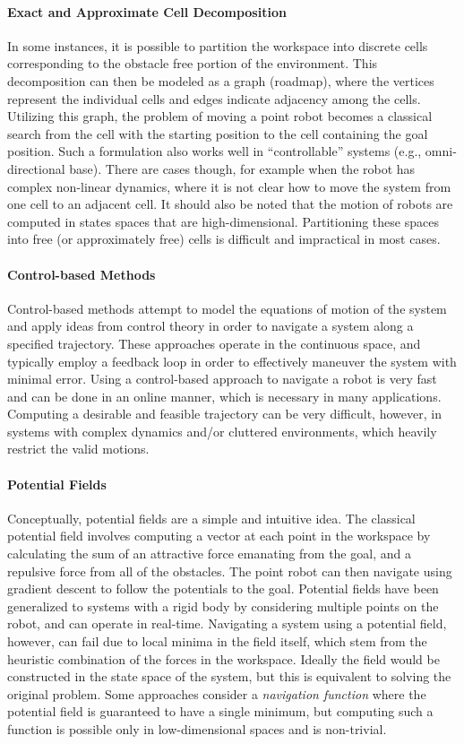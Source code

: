 \paragraph {Exact and Approximate Cell Decomposition}
In some instances, it is possible to partition the workspace into discrete 
cells corresponding to the obstacle free portion of the environment. This 
decomposition can then be modeled as a graph (roadmap), where the vertices 
represent the individual cells and edges indicate adjacency among the cells. 
Utilizing this graph, the problem of moving a point robot becomes a classical 
search from the cell with the starting position to the cell containing the goal 
position. Such a formulation also works well in ``controllable'' systems (e.g., 
omni-directional base). There are cases though, for example when the robot has 
complex non-linear dynamics, where it is not clear how to move the system from 
one cell to an adjacent cell.  It should also be noted that the motion of 
robots are computed in states spaces that are high-dimensional.  Partitioning 
these spaces into free (or approximately free) cells is difficult and 
impractical in most cases. 

\paragraph {Control-based Methods}
Control-based methods attempt to model the equations of motion of the system
and apply ideas from control theory in order to navigate a system along a
specified trajectory.  These approaches operate in the continuous space, and
typically employ a feedback loop in order to effectively maneuver the system
with minimal error.  Using a control-based approach to navigate a robot is
very fast and can be done in an online manner, which is necessary in many
applications.  Computing a desirable and feasible trajectory can be very
difficult, however, in systems with complex dynamics and/or cluttered
environments, which heavily restrict the valid motions.

\paragraph {Potential Fields}
Conceptually, potential fields are a simple and intuitive idea.  The classical
potential field involves computing a vector at each point in the workspace by
calculating the sum of an attractive force emanating from the goal, and a
repulsive force from all of the obstacles. The point robot can then navigate
using gradient descent to follow the potentials to the goal. Potential fields 
have been generalized to systems with a rigid body by considering
multiple points on the robot, and can operate in real-time.  Navigating a system 
using a potential field, however, can fail due to local minima in the field 
itself, which stem from the heuristic combination of the forces in the 
workspace.  Ideally the field would be constructed in the state space of the 
system, but this is equivalent to solving the original problem.  Some approaches 
consider a {\it navigation function} where the potential field is guaranteed to 
have a single minimum, but computing such a function is possible only in 
low-dimensional spaces and is non-trivial.

